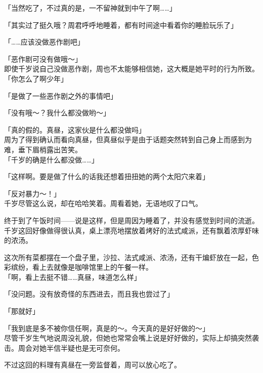 「当然吃了，不过真的是，一不留神就到中午了啊……」

「其实过了挺久哦？周君呼呼地睡着，都有时间途中看着你的睡脸玩乐了」

「……应该没做恶作剧吧」

「恶作剧可没有做哦～」\\

即使千岁说自己没做恶作剧，周也不太能够相信她，这大概是她平时的行为所致。\\

「你怎么了啊少年」

「是做了一些恶作剧之外的事情吧」

「没有哦～？我什么都没做哟～」

「真的假的。真昼，这家伙是什么都没做吗」\\

周为了得到确认而看向真昼，但真昼似乎是由于话题突然转到自己身上而感到为难，垂下眉梢露出苦笑。\\

「千岁的确是什么都没做……」

「这样啊。要是做了什么的话我还想着扭扭她的两个太阳穴来着」

「反对暴力～！」\\

千岁尽管这么说，却在哈哈笑着。周看着她，无语地叹了口气。\\

\vspace{2\baselineskip}

终于到了午饭时间——说是这样，但是周因为睡着了，并没有感觉到时间的流逝。\\

千岁这回好像做得很认真，桌上漂亮地摆放着烤好的法式咸派，还有飘着浓厚虾味的浓汤。

这次所有菜都摆在一个盘子里，沙拉、法式咸派、浓汤，还有干煸虾放在一起，色彩缤纷，看上去就像是咖啡馆里上的午餐一样。\\

「啊，看上去挺不错……真昼，味道怎么样」

「没问题。没有放奇怪的东西进去，而且我也尝过了」

「那就好」

「我到底是多不被你信任啊，真是的～。今天真的是好好做的～」\\

尽管千岁生气地说周没礼貌，但她也常常会嘴上说是好好做的，实际上却搞突然袭击。周会对她半信半疑也是无可奈何。

不过这回的料理有真昼在一旁监督着，周可以放心吃了。\\

